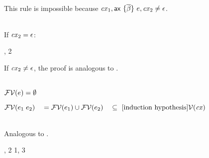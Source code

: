 \begin{bycase}

\Case{\Rcxmt}\\
This rule is impossible because $\mathit{cx}_1,\mathsf{ax}\ \{\overline{\beta}\}\ e,\mathit{cx}_2\neq\epsilon$.

\Case{\Rcxtdec, \Rcxodec, \Rcxtdef, \Rcxlem, \Rcxtvdec, \Rcxvdec}
\begin{derivation}
\steP{\cx_2\neq\mtcx}
\end{derivation}

\Case{\Rcxax}\\
If $\mathit{cx}_2=\epsilon$:
\begin{derivation}
     {\indhyp, 2}
\end{derivation}
If $\mathit{cx}_2\neq\epsilon$, the proof is analogous to \Rcxtdec.

\Case{\Reop, \Redesc, \Reproj}\\
$\mathcal{FV}(e)=\emptyset$

\Case{\Revar}
\begin{derivation}
\step{\vdecO\in\cx}{\premof{\Revar}}
\end{derivation}

\Case{\Reapp}
\begin{links}
$\mathcal{FV}(e_1\;e_2)
 \\\hspace*{1em}=\\
 \mathcal{FV}(e_1)\cup\mathcal{FV}(e_2)
 \\\hspace*{1em}\subseteq\ [\mbox{induction hypothesis}]\\
 \mathcal{V}(\mathit{cx})$
\end{links}

\Case{\Reeq, \Reif, \ReifO, \Resuper, \Resub}\\
Analogous to \Reapp.

\Case{\Reabs}
\begin{derivation}
\step{\efvar{\expr}\subseteq\cxvar{\snoc{\cx}{\vdecO}}}{\indhyp}
\end{derivation}
\Case{\Reabsalpha}
\begin{derivation}
\step{\efvar{\absO}\subseteq\cxvarO}{\indhyp}
     {, 2}
     {1, 3}
\end{derivation}


\end{bycase}
